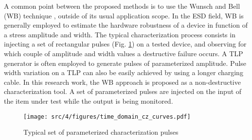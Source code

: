 A common point between the proposed methods is to use the Wunsch and Bell (WB) technique \cite{wunsch-bell}, outside of its usual application scope.
In the ESD field, WB is generally employed to estimate the hardware robustness of a device in function of a stress amplitude and width.
The typical characterization process consists in injecting a set of rectangular pulses (Fig. \ref{set_input_signals}) on a tested device, and observing for which couple of amplitude and width values a destructive failure occurs.
A TLP generator is often employed to generate pulses of parameterized amplitude.
Pulse width variation on a TLP can also be easily achieved by using a longer charging cable.
In this research work, the WB approach is proposed as a non-destructive characterization tool.
A set of parameterized pulses are injected on the input of the item under test while the output is being monitored.

\begin{figure}[!h]
  \centering
  \texttt{[image: src/4/figures/time\_domain\_cz\_curves.pdf]}
  \caption{Typical set of parameterized characterization pulses}
  \label{set_input_signals}
\end{figure}
